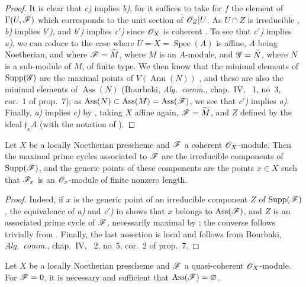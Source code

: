 \begin{proof}
It is clear that \emph{c)} implies \emph{b)}, for it suffices to take for $f$ the element of $\Gamma(U,\mathscr{F})$ which corresponds to the unit section of $\mathscr{O}_Z|U$.
As $U\cap Z$ is irreducible , \emph{b)} implies \emph{b$'$)}, and \emph{b$'$)} implies \emph{c$'$)} since $\mathscr{O}_X$ is coherent .
To see that \emph{c$'$)} implies \emph{a)}, we can reduce to the case where $U=X=\operatorname{Spec}(A)$ is affine, $A$ being Noetherian, and where $\mathscr{F}=\widetilde{M}$, where $M$ is an $A$-module, and $\mathscr{G}=\widetilde{N}$, where $N$ is a sub-module of $M$, of finite type.
We then know that the minimal elements of $\operatorname{Supp}(\mathscr{G})$ are the maximal points of $V(\operatorname{Ann}(N))$ , and these are also the minimal elements of $\operatorname{Ass}(N)$ (Bourbaki, \emph{Alg.\ comm.}, chap.~IV, \textsection~1, no~3, cor.~1 of prop.~7);
as $\operatorname{Ass}(N)\subset\operatorname{Ass}(M)=\operatorname{Ass}(\mathscr{F})$, we see that \emph{c$'$)} implies \emph{a)}.
Finally, \emph{a)} implies \emph{c)} by , taking $X$ affine again, $\mathscr{F}=\widetilde{M}$, and $Z$ defined by the ideal $\mathfrak{j}_xA$ (with the notation of ).
\end{proof}

\begin{corollary}[3.1.4]
\label{IV.3.1.4}
Let $X$ be a locally Noetherian prescheme and $\mathscr{F}$ a coherent $\mathscr{O}_X$-module.
Then the maximal prime cycles associated to $\mathscr{F}$ are the irreducible components of $\operatorname{Supp}(\mathscr{F})$, and the generic points of these components are the points $x\in X$ such that $\mathscr{F}_x$ is an $\mathscr{O}_x$-module of finite nonzero length.
\end{corollary}

\begin{proof}
Indeed, if $x$ is the generic point of an irreducible component $Z$ of $\operatorname{Supp}(\mathscr{F})$, the equivalence of \emph{a)} and \emph{c$'$)} in  shows that $x$ belongs to $\operatorname{Ass}(\mathscr{F})$, and $Z$ is an associated prime cycle of $\mathscr{F}$, necessarily maximal by ; the converse follows trivially from . Finally, the last assertion is local and follows from Bourbaki, \emph{Alg.\ comm.}, chap.~IV, \textsection~2, no~5, cor.~2 of prop.~7.
\end{proof}

\begin{corollary}[3.1.5]
\label{IV.3.1.5}
Let $X$ be a locally Noetherian prescheme and $\mathscr{F}$ a quasi-coherent $\mathscr{O}_X$-module.
For $\mathscr{F}=0$, it is necessary and sufficient that $\operatorname{Ass}(\mathscr{F})=\varnothing$.
\end{corollary}

